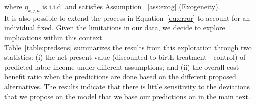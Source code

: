 \noindent where $\eta_{k,j,{a}}$ is i.i.d. and satisfies Assumption ~\ref{ass:exog} (Exogeneity).\\

\noindent It is also possible to extend the process in Equation~\eqref{eq:error} to account for an individual fixed. Given the limitations in our data, we decide to explore implications within this context.\\

\noindent Table~\ref{table:predsens} summarizes the results from this exploration through two statistics: (i) the net present value (discounted to birth treatment - control) of predicted labor income under different assumptions; and (ii) the overall cost-benefit ratio when the predictions are done based on the different proposed alternatives. The results indicate that there is little sensitivity to the deviations that we propose on the model that we base our predictions on in the main text.\\

